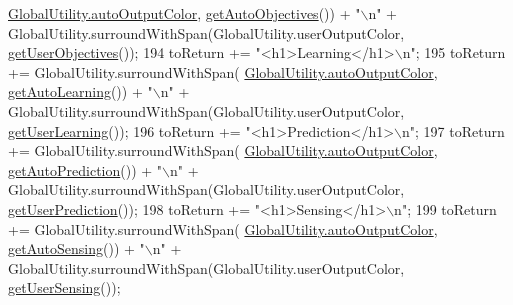 \begin{DoxyCode}
      \hyperlink{classit_1_1isislab_1_1masonhelperdocumentation_1_1analizer_1_1_global_utility_a42aa676ad1ff27c42cd4aab651ff2a35}{GlobalUtility.autoOutputColor}, \hyperlink{classit_1_1isislab_1_1masonhelperdocumentation_1_1_o_d_d_1_1_design_concepts_adb483adb7985024c15c15e7ba3234f0e}{getAutoObjectives}()) + \textcolor{stringliteral}{"\(\backslash\)n"} + 
      GlobalUtility.surroundWithSpan(GlobalUtility.userOutputColor, \hyperlink{classit_1_1isislab_1_1masonhelperdocumentation_1_1_o_d_d_1_1_design_concepts_afc17d14bd16ee6357780ca483158c877}{getUserObjectives}());
194             toReturn += \textcolor{stringliteral}{"<h1>Learning</h1>\(\backslash\)n"};
195             toReturn += GlobalUtility.surroundWithSpan(
      \hyperlink{classit_1_1isislab_1_1masonhelperdocumentation_1_1analizer_1_1_global_utility_a42aa676ad1ff27c42cd4aab651ff2a35}{GlobalUtility.autoOutputColor}, \hyperlink{classit_1_1isislab_1_1masonhelperdocumentation_1_1_o_d_d_1_1_design_concepts_a682ad4da790d0c83948e7fa57e5c9bac}{getAutoLearning}()) + \textcolor{stringliteral}{"\(\backslash\)n"} + 
      GlobalUtility.surroundWithSpan(GlobalUtility.userOutputColor, \hyperlink{classit_1_1isislab_1_1masonhelperdocumentation_1_1_o_d_d_1_1_design_concepts_ab3d2b25545a723f677cf54548fc17ae2}{getUserLearning}());
196             toReturn += \textcolor{stringliteral}{"<h1>Prediction</h1>\(\backslash\)n"};
197             toReturn += GlobalUtility.surroundWithSpan(
      \hyperlink{classit_1_1isislab_1_1masonhelperdocumentation_1_1analizer_1_1_global_utility_a42aa676ad1ff27c42cd4aab651ff2a35}{GlobalUtility.autoOutputColor}, \hyperlink{classit_1_1isislab_1_1masonhelperdocumentation_1_1_o_d_d_1_1_design_concepts_a266ecb29b4c1de8e7d59692b09463c59}{getAutoPrediction}()) + \textcolor{stringliteral}{"\(\backslash\)n"} + 
      GlobalUtility.surroundWithSpan(GlobalUtility.userOutputColor, \hyperlink{classit_1_1isislab_1_1masonhelperdocumentation_1_1_o_d_d_1_1_design_concepts_a61fd3913e11fee85f390d52831ee63ea}{getUserPrediction}());
198             toReturn += \textcolor{stringliteral}{"<h1>Sensing</h1>\(\backslash\)n"};
199             toReturn += GlobalUtility.surroundWithSpan(
      \hyperlink{classit_1_1isislab_1_1masonhelperdocumentation_1_1analizer_1_1_global_utility_a42aa676ad1ff27c42cd4aab651ff2a35}{GlobalUtility.autoOutputColor}, \hyperlink{classit_1_1isislab_1_1masonhelperdocumentation_1_1_o_d_d_1_1_design_concepts_af20e006b60ffb46567d5cc72e78854de}{getAutoSensing}()) + \textcolor{stringliteral}{"\(\backslash\)n"} + 
      GlobalUtility.surroundWithSpan(GlobalUtility.userOutputColor, \hyperlink{classit_1_1isislab_1_1masonhelperdocumentation_1_1_o_d_d_1_1_design_concepts_a5ef74e6cb5cd8e4fd0ac7299cf0aa2d9}{getUserSensing}());

\end{DoxyCode}
